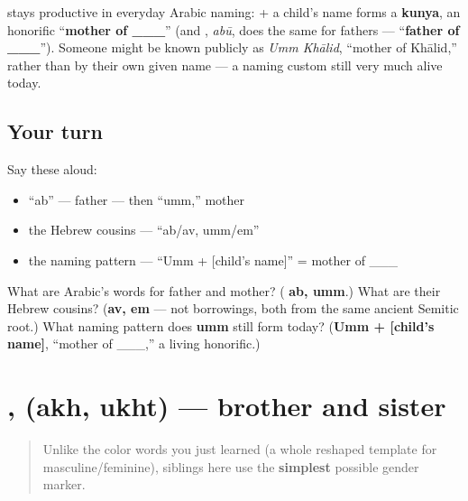 \begin{culture}
\textbf{} stays productive in everyday Arabic naming: \textbf{} + a child's name forms a \textbf{kunya}, an honorific \textquotedblleft{}\textbf{mother of \_\_\_}\textquotedblright{} (and \textbf{}, \emph{abū}, does the same for fathers — \textquotedblleft{}\textbf{father of \_\_\_}\textquotedblright{}). Someone might be known publicly as \emph{Umm Khālid}, \textquotedblleft{}mother of Khālid,\textquotedblright{} rather than by their own given name — a naming custom still very much alive today.
\end{culture}

\subsection*{Your turn}
Say these aloud:

\begin{itemize}
\raggedright
  \item \textquotedblleft{}ab\textquotedblright{} — father — then \textquotedblleft{}umm,\textquotedblright{} mother
  \item the Hebrew cousins — \textquotedblleft{}ab/av, umm/em\textquotedblright{}
  \item the naming pattern — \textquotedblleft{}Umm + {[}child's name{]}\textquotedblright{} = mother of \_\_\_
\end{itemize}

\begin{tcolorbox}[breakable,colback=teal!4,colframe=teal!35!black,title={Before you move on}]
What are Arabic's words for father and mother? (\textbf{ ab,  umm}.) What are their Hebrew cousins? (\textbf{av, em} — not borrowings, both from the same ancient Semitic root.) What naming pattern does \textbf{umm} still form today? (\textbf{Umm + {[}child's name{]}}, \textquotedblleft{}mother of \_\_\_,\textquotedblright{} a living honorific.)
\end{tcolorbox}
\section[\texorpdfstring{\ar{أخ} \ar{أخت} (akh ukht)}{أخ أخت (akh ukht)}]{,  (akh, ukht) — brother and sister}

\label{lesson:AR-C10-akh-ukht}



\begin{quote}
Unlike the color words you just learned (a whole reshaped template for masculine/feminine), siblings here use the \textbf{simplest} possible gender marker.
\end{quote}

